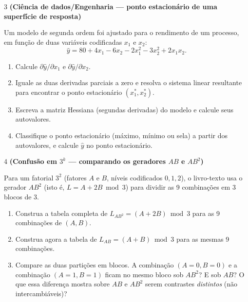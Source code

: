 \documentclass[11pt]{article}
\begin{document}
\begin{questao}{3} \textbf{(Ciência de dados/Engenharia --- ponto estacionário de uma superfície de resposta)}

Um modelo de segunda ordem foi ajustado para o rendimento de um processo, em função de duas
variáveis codificadas $x_1$ e $x_2$:
$$
\hat y = 80 + 4x_1 - 6x_2 - 2x_1^2 - 3x_2^2 + 2x_1x_2.
$$

\begin{enumerate}[label=(\alph*)]
  \item Calcule $\partial \hat y/\partial x_1$ e $\partial \hat y/\partial x_2$.
  \item Iguale as duas derivadas parciais a zero e resolva o sistema linear resultante para
    encontrar o ponto estacionário $(x_1^*, x_2^*)$.
  \item Escreva a matriz Hessiana (segundas derivadas) do modelo e calcule seus autovalores.
  \item Classifique o ponto estacionário (máximo, mínimo ou sela) a partir dos autovalores, e
    calcule $\hat y$ no ponto estacionário.
\end{enumerate}
\end{questao}

\begin{questao}{4} \textbf{(Confusão em $3^k$ --- comparando os geradores $AB$ e $AB^2$)}

Para um fatorial $3^2$ (fatores $A$ e $B$, níveis codificados $0,1,2$), o livro-texto usa o
gerador $AB^2$ (isto é, $L=A+2B \bmod 3$) para dividir as 9 combinações em 3 blocos de 3.

\begin{enumerate}[label=(\alph*)]
  \item Construa a tabela completa de $L_{AB^2} = (A+2B)\bmod3$ para as 9 combinações de $(A,B)$.
  \item Construa agora a tabela de $L_{AB} = (A+B)\bmod3$ para as mesmas 9 combinações.
  \item Compare as duas partições em blocos. A combinação $(A{=}0,B{=}0)$ e a combinação
    $(A{=}1,B{=}1)$ ficam no mesmo bloco sob $AB^2$? E sob $AB$? O que essa diferença mostra sobre
    $AB$ e $AB^2$ serem contrastes \emph{distintos} (não intercambiáveis)?
\end{enumerate}
\end{questao}
\end{document}
